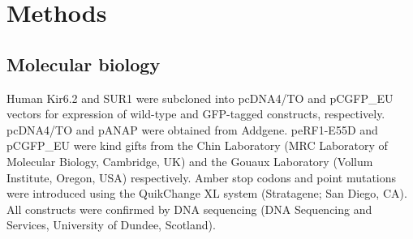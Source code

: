 \chapter{\label{ch:2-methods}Methods}

\graphicspath{{figures/ch2/}}

\minitoc

\section{Molecular biology}
Human Kir6.2 and SUR1 were subcloned into pcDNA4/TO and pCGFP\_EU vectors for expression of wild-type and GFP-tagged constructs, respectively.
pcDNA4/TO and pANAP were obtained from Addgene.
peRF1-E55D and pCGFP\_EU were kind gifts from the Chin Laboratory (MRC Laboratory of Molecular Biology, Cambridge, UK) and the Gouaux Laboratory (Vollum Institute, Oregon, USA) respectively.
Amber stop codons and point mutations were introduced using the QuikChange XL system (Stratagene; San Diego, CA).
All constructs were confirmed by DNA sequencing (DNA Sequencing and Services, University of Dundee, Scotland).


